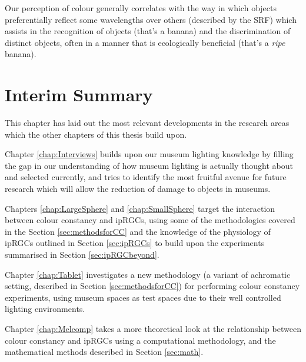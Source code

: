 Our perception of colour generally correlates with the way in which objects preferentially reflect some wavelengths over others (described by the \acrfull{SRF}) which assists in the recognition of objects (that's a banana) and the discrimination of distinct objects, often in a manner that is ecologically beneficial (that's a \emph{ripe} banana).

\newpage












\section{Interim Summary}

This chapter has laid out the most relevant developments in the research areas which the other chapters of this thesis build upon. 

Chapter \ref{chap:Interviews} builds upon our museum lighting knowledge by filling the gap in our understanding of how museum lighting is actually thought about and selected currently, and tries to identify the most fruitful avenue for future research which will allow the reduction of damage to objects in museums.

Chapters \ref{chap:LargeSphere} and \ref{chap:SmallSphere} target the interaction between colour constancy and \glspl{ipRGC}, using some of the methodologies covered in the Section \ref{sec:methodsforCC} and the knowledge of the physiology of \glspl{ipRGC} outlined in Section \ref{sec:ipRGCs} to build upon the experiments summarised in Section \ref{sec:ipRGCbeyond}.

Chapter \ref{chap:Tablet} investigates a new methodology (a variant of achromatic setting, described in Section \ref{sec:methodsforCC}) for performing colour constancy experiments, using museum spaces as test spaces due to their well controlled lighting environments.

Chapter \ref{chap:Melcomp} takes a more theoretical look at the relationship between colour constancy and \glspl{ipRGC} using a computational methodology, and the mathematical methods described in Section \ref{sec:math}.
